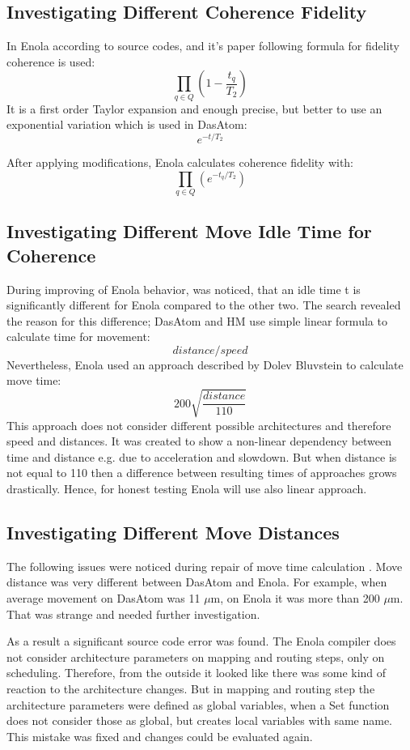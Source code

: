 \subsection{Investigating Different Coherence Fidelity}
In Enola according to source codes, and it's paper following formula for fidelity coherence is used:
\[\prod_{q \in Q} \left(1 - \frac{t_q}{T_2} \right)\]
It is a first order Taylor expansion and enough precise, but better to use an exponential variation which is used in DasAtom:
\[e^{-t / T_2}\]

After applying modifications, Enola calculates coherence fidelity with: \[\prod_{q \in Q} \left(e^{-t_q /  T_2} \right)\]

\subsection{Investigating Different Move Idle Time for Coherence}
During improving of Enola behavior, was noticed, that an idle time t is significantly different for Enola compared to the other two.
The search revealed the reason for this difference; DasAtom and \ac{HM} use simple linear formula to calculate time for movement: \[distance/speed\]
Nevertheless, Enola used an approach described by Dolev Bluvstein to calculate move time:
\[200 \sqrt{\frac{distance}{110}}\]
This approach does not consider different possible architectures and therefore speed and distances. 
It was created to show a non-linear dependency between time and distance e.g. due to acceleration and slowdown.
But when distance is not equal to 110 then a difference between resulting times of approaches grows drastically.
Hence, for honest testing Enola will use also linear approach.

\subsection{Investigating Different Move Distances}
The following issues were noticed during repair of move time calculation \parencite{Emil_Khusainov_Bachelor_GIT}. 
Move distance was very different between DasAtom and Enola. 
For example, when average movement on DasAtom was 11 $\mu$m, on Enola it was more than 200 $\mu$m. 
That was strange and needed further investigation.

As a result a significant source code error was found. 
The Enola compiler does not consider architecture parameters on mapping and routing steps, only on scheduling.
Therefore, from the outside it looked like there was some kind of reaction to the architecture changes.
But in mapping and routing step the architecture parameters were defined as global variables, 
when a Set function does not consider those as global, but creates local variables with same name.
This mistake was fixed and changes could be evaluated again.

